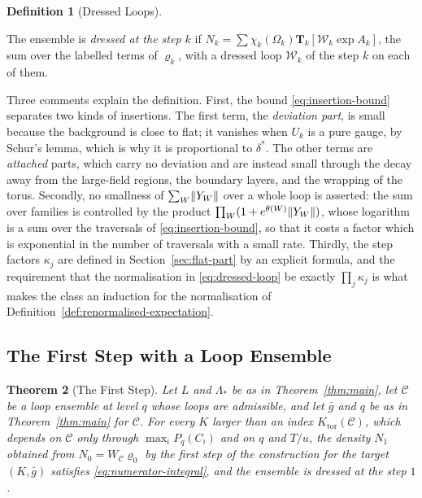 \documentclass[11pt]{preprint}
\DeclarePairedDelimiter{\norm}{\lVert}{\rVert}
\numberwithin{equation}{section}
\newtheorem{theorem}{Theorem}[section]
\theoremstyle{definition}
\newtheorem{definition}[theorem]{Definition}
\theoremstyle{remark}
\theoremstyle{plain}
\begin{document}
\begin{definition}[Dressed Loops]
\begin{enumerate}[label=(\roman*)]
\end{enumerate}
The ensemble is \emph{dressed at the step $k$} if $N_k = \sum\chi_k(\Omega_k)\mathbf T_k[\mathcal W_k\exp A_k]$, the sum over the labelled terms of $\varrho_k$, with a dressed loop $\mathcal W_k$ of the step $k$ on each of them.
\end{definition}

Three comments explain the definition. First, the bound \eqref{eq:insertion-bound} separates two kinds of insertions. The first term, the \emph{deviation part}, is small because the background is close to flat; it vanishes when $U_k$ is a pure gauge, by Schur's lemma, which is why it is proportional to $\delta^{*}$. The other terms are \emph{attached} parts, which carry no deviation and are instead small through the decay away from the large-field regions, the boundary layers, and the wrapping of the torus. Secondly, no smallness of $\sum_W\norm{Y_W}$ over a whole loop is asserted: the sum over families is controlled by the product $\prod_W(1 + e^{\theta(W)}\norm{Y_W})$, whose logarithm is a sum over the traversals of \eqref{eq:insertion-bound}, so that it costs a factor which is exponential in the number of traversals with a small rate. Thirdly, the step factors $\kappa_j$ are defined in Section~\ref{sec:flat-part} by an explicit formula, and the requirement that the normalisation in \eqref{eq:dressed-loop} be exactly $\prod_j\kappa_j$ is what makes the class an induction for the normalisation of Definition~\ref{def:renormalised-expectation}.

\subsection{The First Step with a Loop Ensemble}\label{sec:first-step-proof}

\begin{theorem}[The First Step]\label{thm:first-step}
Let $L$ and $\Lambda_*$ be as in Theorem~\ref{thm:main}, let $\mathcal C$ be a loop ensemble at level $q$ whose loops are admissible, and let $\bar g$ and $q$ be as in Theorem~\ref{thm:main} for $\mathcal C$. For every $K$ larger than an index $K_{\mathrm{tor}}(\mathcal C)$, which depends on $\mathcal C$ only through $\max_iP_q(C_i)$ and on $q$ and $T/u$, the density $N_1$ obtained from $N_0 = W_{\mathcal C}\varrho_0$ by the first step of the construction for the target $(K, \bar g)$ satisfies \eqref{eq:numerator-integral}, and the ensemble is dressed at the step $1$.
\end{theorem}
\end{document}
